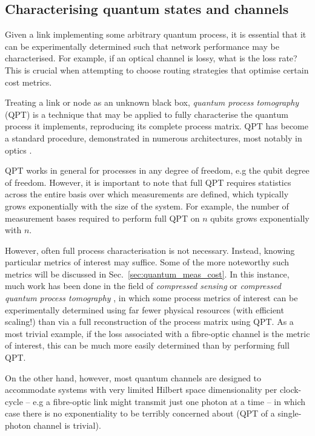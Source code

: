 \documentclass[aps, rmp, twocolumn, amsmath, amssymb, nofootinbib, superscriptaddress, longbibliography, floatfix, table-of-contents, eqsecnum]{revtex4-1}
\begin{document}
%
%

\subsection{Characterising quantum states and channels} \label{sec:QPT}

Given a link implementing some arbitrary quantum process, it is essential that it can be experimentally determined such that network performance may be characterised. For example, if an optical channel is lossy, what is the loss rate? This is crucial when attempting to choose routing strategies that optimise certain cost metrics.

Treating a link or node as an unknown black box, \textit{quantum process tomography} (QPT) \cite{bib:ChuangNielsen97, ???} is a technique that may be applied to fully characterise the quantum process it implements, reproducing its complete process matrix. QPT has become a standard procedure, demonstrated in numerous architectures, most notably in optics \cite{bib:OBrien04, bib:RohdeGateChar05}.

QPT works in general for processes in any degree of freedom, e.g the qubit degree of freedom. However, it is important to note that full QPT requires statistics across the entire basis over which measurements are defined, which typically grows exponentially with the size of the system. For example, the number of measurement bases required to perform full QPT on $n$ qubits grows exponentially with $n$.

However, often full process characterisation is not necessary. Instead, knowing particular metrics of interest may suffice. Some of the more noteworthy such metrics will be discussed in Sec.~\ref{sec:quantum_meas_cost}. In this instance, much work has been done in the field of \textit{compressed sensing} or \textit{compressed quantum process tomography} \cite{???,compressed_sensing}, in which some process metrics of interest can be experimentally determined using far fewer physical resources (with efficient scaling!) than via a full reconstruction of the process matrix using QPT. As a most trivial example, if the loss associated with a fibre-optic channel is the metric of interest, this can be much more easily determined than by performing full QPT.

On the other hand, however, most quantum channels are designed to accommodate systems with very limited Hilbert space dimensionality per clock-cycle -- e.g a fibre-optic link might transmit just one photon at a time -- in which case there is no exponentiality to be terribly concerned about (QPT of a single-photon channel is trivial).
\end{document}
